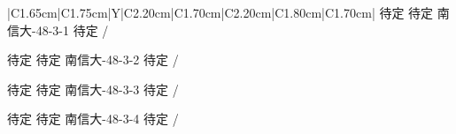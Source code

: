 \Needspace{7.5cm}
\begin{tabularx}{\textwidth}{|C{1.65cm}|C{1.75cm}|Y|C{2.20cm}|C{1.70cm}|C{2.20cm}|C{1.80cm}|C{1.70cm}|}
\HeaderRow
{}
{待定 \newline 待定}
{南信大-48-3-1}
{待定}
{}
{}{/}

{待定 \newline 待定 }
{南信大-48-3-2}
{待定}
{}
{}{/}


{待定 \newline 待定}
{南信大-48-3-3}
{待定}
{}
{}{/}

{待定\newline  
待定 }
{南信大-48-3-4}
{待定}
{}
{}{/}
\end{tabularx}
\BlockGap



